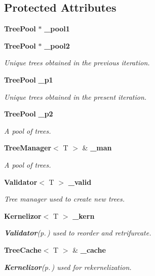 \subsection*{Protected Attributes}
\begin{CompactItemize}
\item 
{\bf Tree\-Pool} $\ast$ {\bf \_\-pool1}
\item 
{\bf Tree\-Pool} $\ast$ {\bf \_\-pool2}
\begin{CompactList}\small\item\em Unique trees obtained in the previous iteration. \item\end{CompactList}\item 
{\bf Tree\-Pool} {\bf \_\-p1}
\begin{CompactList}\small\item\em Unique trees obtained in the present iteration. \item\end{CompactList}\item 
{\bf Tree\-Pool} {\bf \_\-p2}
\begin{CompactList}\small\item\em A pool of trees. \item\end{CompactList}\item 
{\bf Tree\-Manager}$<$ T $>$ \& {\bf \_\-man}
\begin{CompactList}\small\item\em A pool of trees. \item\end{CompactList}\item 
{\bf Validator}$<$ T $>$ {\bf \_\-valid}
\begin{CompactList}\small\item\em Tree manager used to create new trees. \item\end{CompactList}\item 
{\bf Kernelizor}$<$ T $>$ {\bf \_\-kern}
\begin{CompactList}\small\item\em {\bf Validator}{\rm (p.\,\pageref{classValidator})} used to reorder and retrifurcate. \item\end{CompactList}\item 
{\bf Tree\-Cache}$<$ T $>$ \& {\bf \_\-cache}
\begin{CompactList}\small\item\em {\bf Kernelizor}{\rm (p.\,\pageref{classKernelizor})} used for rekernelization. \item\end{CompactList}\item 

\end{CompactItemize}
